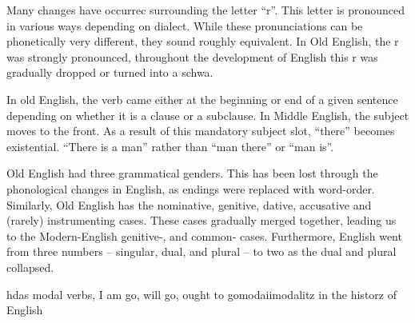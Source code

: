 \documentclass[12pt]{report}
\begin{document}
Many changes have occurrec surrounding the letter ``r''. This letter is
pronounced in various ways depending on dialect. While these pronunciations
can be phonetically very different, they sound roughly equivalent. In Old
English, the r was strongly pronounced, throughout the development of English
this r was gradually dropped or turned into a schwa.

In old English, the verb came either at the beginning or end of a given sentence
depending on whether it is a clause or a subclause. In Middle English, the
subject moves to the front. As a result of this mandatory subject slot,
``there'' becomes existential. ``There is a man'' rather than ``man there'' or
``man is''.

Old English had three grammatical genders. This has been lost through the
phonological changes in English, as endings were replaced with word-order.
Similarly, Old English has the nominative, genitive, dative, accusative and
(rarely) instrumenting cases. These cases gradually merged together, leading us
to the Modern-English genitive-, and common- cases. Furthermore, English went
from three numbers -- singular, dual, and plural -- to two as the dual and
plural collapsed.

hdas modal verbs, I am go, will go, ought to gomodaiimodalitz in the historz of
English
\end{document}
